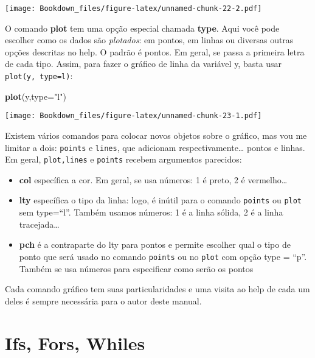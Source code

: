 \documentclass[
]{book}
\newenvironment{Shaded}{\begin{snugshade}}{\end{snugshade}}
\newcommand{\DataTypeTok}[1]{\textcolor[rgb]{0.13,0.29,0.53}{#1}}
\newcommand{\KeywordTok}[1]{\textcolor[rgb]{0.13,0.29,0.53}{\textbf{#1}}}
\newcommand{\NormalTok}[1]{#1}
\newcommand{\StringTok}[1]{\textcolor[rgb]{0.31,0.60,0.02}{#1}}
\providecommand{\tightlist}{%
  \setlength{\itemsep}{0pt}\setlength{\parskip}{0pt}}
\begin{document}
\texttt{[image: Bookdown\_files/figure-latex/unnamed-chunk-22-2.pdf]}

O comando \textbf{plot} tem uma opção especial chamada \textbf{type}. Aqui você pode escolher como os dados são \emph{plotados}: em pontos, em linhas ou diversas outras opções descritas no help. O padrão é pontos. Em geral, se passa a primeira letra de cada tipo. Assim, para fazer o gráfico de linha da variável y, basta usar \texttt{plot(y,\ type=\textquotesingle{}\textquotesingle{}l\textquotesingle{}\textquotesingle{})}:

\begin{Shaded}
\begin{Highlighting}[]
\KeywordTok{plot}\NormalTok{(y,}\DataTypeTok{type=}\StringTok{"l"}\NormalTok{)}
\end{Highlighting}
\end{Shaded}

\texttt{[image: Bookdown\_files/figure-latex/unnamed-chunk-23-1.pdf]}

Existem vários comandos para colocar novos objetos sobre o gráfico, mas vou me limitar a dois: \texttt{points} e \texttt{lines}, que adicionam respectivamente\ldots{} pontos e linhas. Em geral, \texttt{plot,lines} e \texttt{points} recebem argumentos parecidos:

\begin{itemize}
\tightlist
\item
  \textbf{col} específica a cor. Em geral, se usa números: 1 é preto, 2 é vermelho\ldots{}
\item
  \textbf{lty} específica o tipo da linha: logo, é inútil para o comando \texttt{points} ou \texttt{plot} sem type=``l''. Também usamos números: 1 é a linha sólida, 2 é a linha tracejada\ldots{}
\item
  \textbf{pch} é a contraparte do lty para pontos e permite escolher qual o tipo de ponto que será usado no comando \texttt{points} ou no \texttt{plot} com opção type = ``p''. Também se usa números para especificar como serão os pontos
\end{itemize}

Cada comando gráfico tem suas particularidades e uma visita ao help de cada um deles é sempre necessária para o autor deste manual.

\hypertarget{ifs-fors-whiles}{%
\chapter{Ifs, Fors, Whiles}\label{ifs-fors-whiles}}
\end{document}
